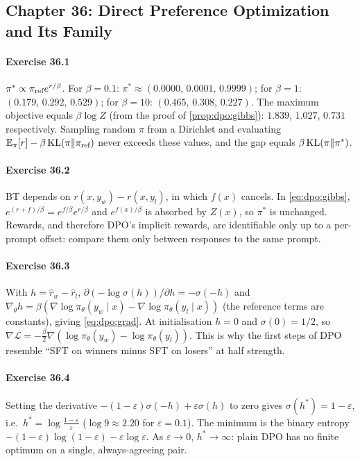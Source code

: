 \subsection*{Chapter 36: Direct Preference Optimization and Its Family}

\paragraph{Exercise 36.1} $\pi^*\propto\pi_{\text{ref}} e^{r/\beta}$. For $\beta=0.1$:
$\pi^*\approx(0.0000,\,0.0001,\,0.9999)$; for $\beta=1$: $(0.179,\,0.292,\,0.529)$; for $\beta=10$:
$(0.465,\,0.308,\,0.227)$. The maximum objective equals $\beta\log Z$ (from the proof of
\cref{prop:dpo:gibbs}): $1.839$, $1.027$, $0.731$ respectively. Sampling random $\pi$ from a Dirichlet
and evaluating $\mathbb{E}_\pi[r]-\beta\operatorname{KL}(\pi\|\pi_{\text{ref}})$ never exceeds these values, and the gap equals
$\beta\operatorname{KL}(\pi\|\pi^*)$.

\paragraph{Exercise 36.2} BT depends on $r(x,y_w)-r(x,y_l)$, in which $f(x)$ cancels. In
\eqref{eq:dpo:gibbs}, $e^{(r+f)/\beta}=e^{f/\beta}e^{r/\beta}$ and $e^{f(x)/\beta}$ is absorbed by
$Z(x)$, so $\pi^*$ is unchanged. Rewards, and therefore DPO's implicit rewards, are identifiable
only up to a per-prompt offset: compare them only between responses to the same prompt.

\paragraph{Exercise 36.3} With $h=\hat r_w-\hat r_l$, $\partial(-\log\sigma(h))/\partial h=-\sigma(-h)$
and $\nabla_\theta h=\beta(\nabla\log\pi_\theta(y_w\mid x)-\nabla\log\pi_\theta(y_l\mid x))$ (the
reference terms are constants), giving \eqref{eq:dpo:grad}. At initialisation $h=0$ and
$\sigma(0)=1/2$, so $\nabla\mathcal{L}=-\frac{\beta}{2}\nabla(\log\pi_\theta(y_w)-\log\pi_\theta(y_l))$.
This is why the first steps of DPO resemble ``SFT on winners minus SFT on losers'' at half strength.

\paragraph{Exercise 36.4} Setting the derivative $-(1-\varepsilon)\sigma(-h)+\varepsilon\sigma(h)$
to zero gives $\sigma(h^*)=1-\varepsilon$, i.e.\ $h^*=\log\frac{1-\varepsilon}{\varepsilon}$
($\log 9\approx2.20$ for $\varepsilon=0.1$). The minimum is the binary entropy
$-(1-\varepsilon)\log(1-\varepsilon)-\varepsilon\log\varepsilon$. As $\varepsilon\to0$, $h^*\to\infty$:
plain DPO has no finite optimum on a single, always-agreeing pair.

